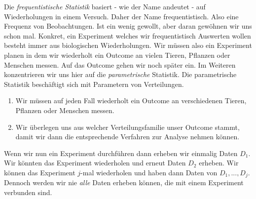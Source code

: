 \documentclass[
  letterpaper,
]{scrbook}
\providecommand{\tightlist}{%
  \setlength{\itemsep}{0pt}\setlength{\parskip}{0pt}}\usepackage{longtable,booktabs,array}
\begin{document}
{}

{}

Die \emph{frequentistische Statistik} basiert - wie der Name andeutet -
auf Wiederholungen in einem Versuch. Daher der Name frequentistisch.
Also eine Frequenz von Beobachtungen. Ist ein wenig gewollt, aber daran
gewöhnen wir uns schon mal. Konkret, ein Experiment welches wir
frequentistisch Auswerten wollen besteht immer aus biologischen
Wiederholungen. Wir müssen also ein Experiment planen in dem wir
wiederholt ein Outcome an vielen Tieren, Pflanzen oder Menschen messen.
Auf das Outcome gehen wir noch später ein. Im Weiteren konzentrieren wir
uns hier auf die \emph{parametrische} Statistik. Die parametrische
Statistik beschäftigt sich mit Parametern von Verteilungen.

\begin{tcolorbox}[enhanced jigsaw, coltitle=black, titlerule=0mm, bottomrule=.15mm, opacityback=0, opacitybacktitle=0.6, leftrule=.75mm, title=\textcolor{quarto-callout-note-color}{\faInfo}\hspace{0.5em}{Wie gehen wir nun vor, wenn wir ein Experiment durchführen wollen?}, toprule=.15mm, bottomtitle=1mm, toptitle=1mm, left=2mm, breakable, arc=.35mm, colback=white, rightrule=.15mm, colbacktitle=quarto-callout-note-color!10!white, colframe=quarto-callout-note-color-frame]

\begin{enumerate}
\def\labelenumi{\arabic{enumi})}
\tightlist
\item
  Wir müssen auf jeden Fall wiederholt ein Outcome an verschiedenen
  Tieren, Pflanzen oder Menschen messen.
\item
  Wir überlegen uns aus welcher Verteilungsfamilie unser Outcome stammt,
  damit wir dann die entsprechende Verfahren zur Analyse nehmen können.
\end{enumerate}

\end{tcolorbox}

Wenn wir nun ein Experiment durchführen dann erheben wir einmalig Daten
\(D_1\). Wir könnten das Experiment wiederholen und erneut Daten \(D_2\)
erheben. Wir können das Experiment \(j\)-mal wiederholen und haben dann
Daten von \(D_1,..., D_j\). Dennoch werden wir nie \emph{alle} Daten
erheben können, die mit einem Experiment verbunden sind.
\end{document}
